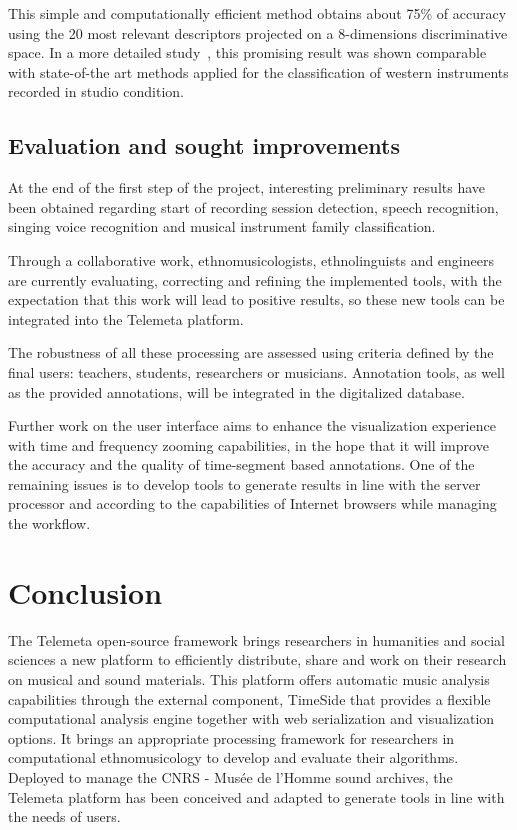 \documentclass{sig-alternate}
\begin{document}
This simple and computationally efficient method obtains about 75\% of accuracy 
using the 20 most relevant descriptors projected on a 8-dimensions discriminative space. In a more detailed study~\cite{ismir14_dfourer},
this promising result was shown comparable with state-of-the art methods applied for the classification of western instruments recorded in studio condition.



\subsection{Evaluation and sought improvements}

At the end of the first step of the project, interesting preliminary results have been obtained regarding start of recording session detection, speech recognition, singing voice recognition and musical instrument family classification.

Through a collaborative work, ethnomusicologists, ethnolinguists and engineers are currently evaluating, correcting and refining the implemented tools, with the expectation that this work will lead to positive results, so these new tools can be integrated into the Telemeta platform. 

The robustness of all these processing are assessed using criteria defined by the final users: teachers, students, researchers or musicians. Annotation tools, as well as the provided annotations, will be integrated in the digitalized database. 

Further work on the user interface aims to enhance the visualization experience with time and frequency zooming capabilities, in the hope that it will improve the accuracy and the quality of time-segment based annotations. One of the remaining issues is to develop tools to generate results in line with the server processor and according to the capabilities of Internet browsers while managing the workflow. 


\section{Conclusion}
 The Telemeta open-source framework brings researchers in humanities and social sciences a new platform to efficiently distribute, share and work on their research on musical and sound materials. 
This platform offers automatic music analysis capabilities through the external component, TimeSide that provides a flexible computational analysis engine together with web serialization and visualization options. 
It brings an appropriate processing framework for researchers in computational ethnomusicology to develop and evaluate their algorithms. 
Deployed to manage the CNRS - Musée de l’Homme sound archives, the Telemeta platform has been conceived and adapted to generate tools in line with the needs of users. 
\end{document}
